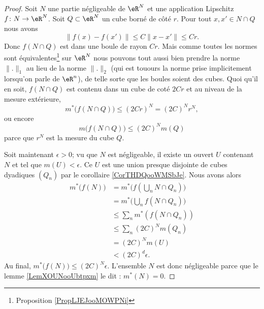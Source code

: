 \begin{proof}
    Soit \( N\) une partie négligeable de \( \eR^N\) et une application Lipschitz \( f\colon N\to \eR^N\). Soit \( Q\subset \eR^N\) un cube borné de côté \( r\). Pour tout \( x,x'\in N\cap Q\) nous avons
    \begin{equation}
        \| f(x)-f(x') \|\leq C\| x-x' \|\leq Cr.
    \end{equation}
    Donc \( f(N\cap Q)\) est dans une boule de rayon \( Cr\). Mais comme toutes les normes sont équivalentes\footnote{Proposition \ref{PropLJEJooMOWPNi}} sur \( \eR^N\) nous pouvons tout aussi bien prendre la norme \( \| . \|_1\) au lieu de la norme \( \| . \|_2\) (qui est touours la norme prise implicitement lorsqu'on parle de \( \eR^n\)), de telle sorte que les boules soient des cubes. Quoi qu'il en soit, \( f(N\cap Q)\) est contenu dans un cube de coté \( 2Cr\) et au niveau de la mesure extérieure,
    \begin{equation}
        m^*\big( f(N\cap Q) \big)\leq (2Cr)^N=(2C)^Nr^N,
    \end{equation}
    ou encore
    \begin{equation}
        m\big(f(N\cap Q)\big)\leq (2C)^Nm(Q)
    \end{equation}
    parce que \( r^N\) est la mesure du cube \( Q\).

    Soit maintenant \( \epsilon>0\); vu que \( N\) est négligeable, il existe un ouvert \( U\) contenant \( N\) et tel que \( m(U)<\epsilon\). Ce \( U\) est une union presque disjointe de cubes dyadiques \( (Q_n)\) par le corollaire \ref{CorTHDQooWMSbJe}. Nous avons alors
    \begin{subequations}
        \begin{align}
            m^*\big( f(N) \big)&=m^*\big( f(\bigcup_nN\cap Q_n) \big)\\
            &=m^*\big( \bigcup_nf(N\cap Q_n) \big)\\
            &\leq \sum_nm^*(f(N\cap Q_n))\\
            &\leq \sum_n(2C)^Nm(Q_n)\\
            &=(2C)^Nm(U)\\
            &<(2C)^d\epsilon.
        \end{align}
    \end{subequations}
    Au final, \( m^*\big( f(N) \big)\leq (2C)^N\epsilon\).  L'ensemble \( N\) est donc négligeable parce que le lemme \ref{LemXOUNooUbtpxm} le dit : \( m^*(N)=0\).
\end{proof} 

